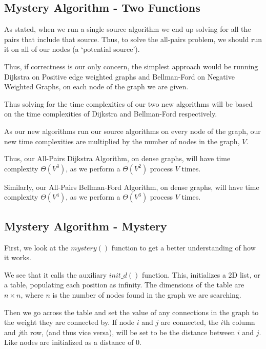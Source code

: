 \documentclass{article}
\begin{document}



\subsection{Mystery Algorithm - Two Functions}

As stated, when we run a single source algorithm we end up solving for all the pairs that include that source. Thus, to solve the all-pairs problem, we should run it on all of our nodes (a `potential source').

Thus, if correctness is our only concern, the simplest approach would be running Dijkstra on Positive edge weighted graphs and Bellman-Ford on Negative Weighted Graphs,
on each node of the graph we are given.

Thus solving for the time complexities of our two new algorithms will be based on the time complexities of Dijkstra and Bellman-Ford respectively.

As our new algorithms run our source algorithms on every node of the graph, our new time complexities are multiplied by the number of nodes in the graph, $V$.

Thus, our All-Pairs Dijkstra Algorithm, on dense graphs, will have time complexity $\Theta(V^3)$, as we perform a $\Theta(V^2)$ process $V$ times.

Similarly, our All-Pairs Bellman-Ford Algorithm, on dense graphs, will have time complexity $\Theta(V^4)$, as we perform a $\Theta(V^3)$ process $V$ times.

\subsection{Mystery Algorithm - Mystery}

First, we look at the $mystery()$ function to get a better understanding of how it works.

We see that it calls the auxiliary $init\_d()$ function. This, initializes a 2D list, or a table, populating each position as infinity. The dimensions of the table are $n \times n$, where $n$ is the number of nodes found in the graph we are searching.

Then we go across the table and set the value of any connections in the graph to the weight they are connected by. If node $i$ and $j$ are connected, the $i$th column and $j$th row, (and thus vice versa), will be set to be the distance between $i$ and $j$. Like nodes are initialized as a distance of 0.
\end{document}
